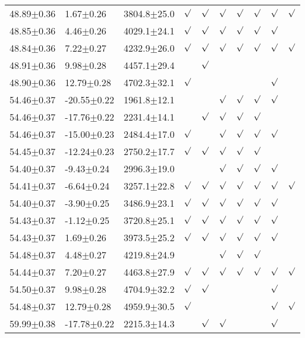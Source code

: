 \begin{table}[h]
\begin{center}
\begin{tabular}{llllllllll}
48.89$\pm$0.36 & 1.67$\pm$0.26 & 3804.8$\pm$25.0& $\surd$ & $\surd$ & $\surd$ & $\surd$ & $\surd$ & $\surd$ & $\surd$ \\
48.85$\pm$0.36 & 4.46$\pm$0.26 & 4029.1$\pm$24.1& $\surd$ & $\surd$ & $\surd$ & $\surd$ & $\surd$ & $\surd$ & \\
48.84$\pm$0.36 & 7.22$\pm$0.27 & 4232.9$\pm$26.0& $\surd$ & $\surd$ & $\surd$ & $\surd$ & $\surd$ & $\surd$ & $\surd$ \\
48.91$\pm$0.36 & 9.98$\pm$0.28 & 4457.1$\pm$29.4& & $\surd$ & & & & & \\
48.90$\pm$0.36 & 12.79$\pm$0.28 & 4702.3$\pm$32.1& $\surd$ & & & & & $\surd$ & \\
54.46$\pm$0.37 & -20.55$\pm$0.22 & 1961.8$\pm$12.1& & & $\surd$ & $\surd$ & $\surd$ & $\surd$ & \\
54.46$\pm$0.37 & -17.76$\pm$0.22 & 2231.4$\pm$14.1& & $\surd$ & $\surd$ & $\surd$ & $\surd$ & & \\
54.46$\pm$0.37 & -15.00$\pm$0.23 & 2484.4$\pm$17.0& $\surd$ & & $\surd$ & $\surd$ & $\surd$ & $\surd$ & \\
54.45$\pm$0.37 & -12.24$\pm$0.23 & 2750.2$\pm$17.7& $\surd$ & $\surd$ & $\surd$ & $\surd$ & $\surd$ & & \\
54.40$\pm$0.37 & -9.43$\pm$0.24 & 2996.3$\pm$19.0& & & $\surd$ & $\surd$ & $\surd$ & $\surd$ & \\
54.41$\pm$0.37 & -6.64$\pm$0.24 & 3257.1$\pm$22.8& $\surd$ & $\surd$ & $\surd$ & $\surd$ & $\surd$ & $\surd$ & $\surd$ \\
54.40$\pm$0.37 & -3.90$\pm$0.25 & 3486.9$\pm$23.1& $\surd$ & $\surd$ & $\surd$ & $\surd$ & $\surd$ & $\surd$ & \\
54.43$\pm$0.37 & -1.12$\pm$0.25 & 3720.8$\pm$25.1& $\surd$ & $\surd$ & $\surd$ & $\surd$ & $\surd$ & $\surd$ & \\
54.43$\pm$0.37 & 1.69$\pm$0.26 & 3973.5$\pm$25.2& $\surd$ & $\surd$ & $\surd$ & $\surd$ & $\surd$ & $\surd$ & \\
54.48$\pm$0.37 & 4.48$\pm$0.27 & 4219.8$\pm$24.9& & & $\surd$ & $\surd$ & $\surd$ & & \\
54.44$\pm$0.37 & 7.20$\pm$0.27 & 4463.8$\pm$27.9& $\surd$ & $\surd$ & $\surd$ & $\surd$ & $\surd$ & $\surd$ & $\surd$ \\
54.50$\pm$0.37 & 9.98$\pm$0.28 & 4704.9$\pm$32.2& $\surd$ & $\surd$ & & & & $\surd$ & \\
54.48$\pm$0.37 & 12.79$\pm$0.28 & 4959.9$\pm$30.5& $\surd$ & & & & & $\surd$ & $\surd$ \\
59.99$\pm$0.38 & -17.78$\pm$0.22 & 2215.3$\pm$14.3& & $\surd$ & $\surd$ & & & $\surd$ & \\

\end{tabular}
\end{center}
\end{table}
